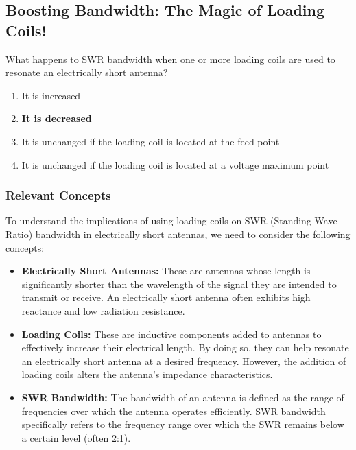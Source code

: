 \subsection{Boosting Bandwidth: The Magic of Loading Coils!}

\begin{tcolorbox}[colback=gray!10, colframe=black, title=E9D06]
What happens to SWR bandwidth when one or more loading coils are used to resonate an electrically short antenna? 
\begin{enumerate}[label=\Alph*.]
    \item It is increased
    \item \textbf{It is decreased}
    \item It is unchanged if the loading coil is located at the feed point
    \item It is unchanged if the loading coil is located at a voltage maximum point
\end{enumerate} \end{tcolorbox}

\subsubsection{Relevant Concepts}
To understand the implications of using loading coils on SWR (Standing Wave Ratio) bandwidth in electrically short antennas, we need to consider the following concepts:

\begin{itemize}
    \item \textbf{Electrically Short Antennas:} These are antennas whose length is significantly shorter than the wavelength of the signal they are intended to transmit or receive. An electrically short antenna often exhibits high reactance and low radiation resistance.
    
    \item \textbf{Loading Coils:} These are inductive components added to antennas to effectively increase their electrical length. By doing so, they can help resonate an electrically short antenna at a desired frequency. However, the addition of loading coils alters the antenna's impedance characteristics.
    
    \item \textbf{SWR Bandwidth:} The bandwidth of an antenna is defined as the range of frequencies over which the antenna operates efficiently. SWR bandwidth specifically refers to the frequency range over which the SWR remains below a certain level (often 2:1).
\end{itemize}

